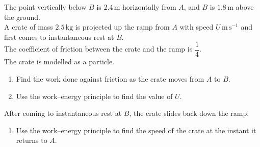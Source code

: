 \documentclass[leqno]{article}
\begin{document}
\begin{enumerate}[
  label=\textbf{\arabic*.},
  leftmargin=*,
  topsep=0pt,
  partopsep=0pt,
  parsep=0pt
]
The point vertically below $B$ is $2.4\,\mathrm{m}$ horizontally from $A$, and $B$ is $1.8\,\mathrm{m}$ above the ground. \\

A crate of mass $2.5\,\mathrm{kg}$ is projected up the ramp from $A$ with speed $U\,\mathrm{m\,s^{-1}}$ and first comes to instantaneous rest at $B$. \\

The coefficient of friction between the crate and the ramp is $\dfrac{1}{4}$. \\

The crate is modelled as a particle. \\

\begin{enumerate}[label=\textbf{(\alph*)}]
  \item Find the work done against friction as the crate moves from $A$ to $B$.  \\
  \item Use the work--energy principle to find the value of $U$.  \\
\end{enumerate}

After coming to instantaneous rest at $B$, the crate slides back down the ramp. \\

\begin{enumerate}[label=\textbf{(\alph*)}, resume]
  \item Use the work--energy principle to find the speed of the crate at the instant it returns to $A$.  \\
\end{enumerate}
\newpage
\questionitem

\begin{figure}[H]
    \centering
{}
\end{figure}
\end{enumerate}
\end{document}
